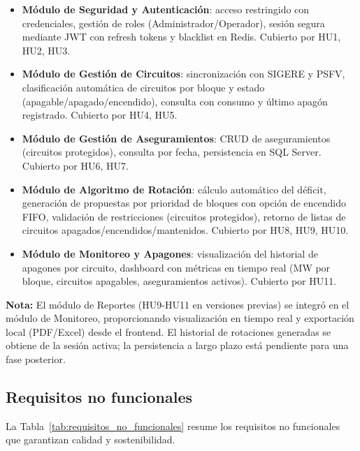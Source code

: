 \begin{itemize}
    \item \textbf{Módulo de Seguridad y Autenticación}: acceso restringido con credenciales, gestión de roles (Administrador/Operador), sesión segura mediante JWT con refresh tokens y blacklist en Redis. Cubierto por HU1, HU2, HU3.
    
    \item \textbf{Módulo de Gestión de Circuitos}: sincronización con SIGERE y PSFV, clasificación automática de circuitos por bloque y estado (apagable/apagado/encendido), consulta con consumo y último apagón registrado. Cubierto por HU4, HU5.
    
    \item \textbf{Módulo de Gestión de Aseguramientos}: CRUD de aseguramientos (circuitos protegidos), consulta por fecha, persistencia en SQL Server. Cubierto por HU6, HU7.
    
    \item \textbf{Módulo de Algoritmo de Rotación}: cálculo automático del déficit, generación de propuestas por prioridad de bloques con opción de encendido FIFO, validación de restricciones (circuitos protegidos), retorno de listas de circuitos apagados/encendidos/mantenidos. Cubierto por HU8, HU9, HU10.
    
    \item \textbf{Módulo de Monitoreo y Apagones}: visualización del historial de apagones por circuito, dashboard con métricas en tiempo real (MW por bloque, circuitos apagables, aseguramientos activos). Cubierto por HU11.
\end{itemize}

\textbf{Nota:} El módulo de Reportes (HU9-HU11 en versiones previas) se integró en el módulo de Monitoreo, proporcionando visualización en tiempo real y exportación local (PDF/Excel) desde el frontend. El historial de rotaciones generadas se obtiene de la sesión activa; la persistencia a largo plazo está pendiente para una fase posterior.

\subsection{Requisitos no funcionales}
La Tabla~\ref{tab:requisitos_no_funcionales} resume los requisitos no funcionales que garantizan calidad y sostenibilidad.


